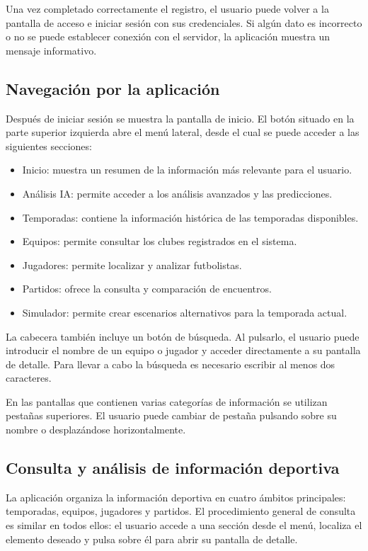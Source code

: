 Una vez completado correctamente el registro, el usuario puede volver a la pantalla de acceso e iniciar sesión con sus credenciales. Si algún dato es incorrecto o no se puede establecer conexión con el servidor, la aplicación muestra un mensaje informativo.

\subsection{Navegación por la aplicación}

Después de iniciar sesión se muestra la pantalla de inicio. El botón situado en la parte superior izquierda abre el menú lateral, desde el cual se puede acceder a las siguientes secciones:

\begin{itemize}
    \item Inicio: muestra un resumen de la información más relevante para el usuario.
    \item Análisis IA: permite acceder a los análisis avanzados y las predicciones.
    \item Temporadas: contiene la información histórica de las temporadas disponibles.
    \item Equipos: permite consultar los clubes registrados en el sistema.
    \item Jugadores: permite localizar y analizar futbolistas.
    \item Partidos: ofrece la consulta y comparación de encuentros.
    \item Simulador: permite crear escenarios alternativos para la temporada actual.
\end{itemize}

La cabecera también incluye un botón de búsqueda. Al pulsarlo, el usuario puede introducir el nombre de un equipo o jugador y acceder directamente a su pantalla de detalle. Para llevar a cabo la búsqueda es necesario escribir al menos dos caracteres.

En las pantallas que contienen varias categorías de información se utilizan pestañas superiores. El usuario puede cambiar de pestaña pulsando sobre su nombre o desplazándose horizontalmente.

\subsection{Consulta y análisis de información deportiva}

La aplicación organiza la información deportiva en cuatro ámbitos principales: temporadas, equipos, jugadores y partidos. El procedimiento general de consulta es similar en todos ellos: el usuario accede a una sección desde el menú, localiza el elemento deseado y pulsa sobre él para abrir su pantalla de detalle.

